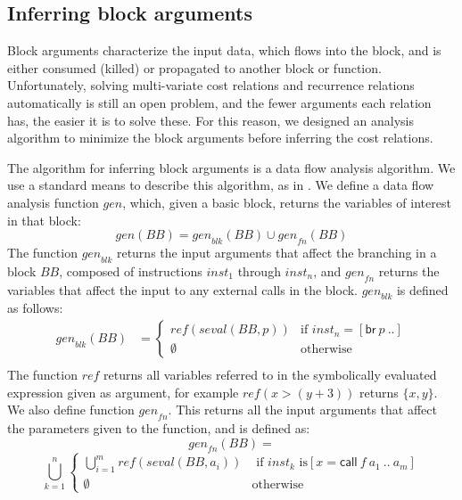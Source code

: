 \documentclass[9pt,preprint]{sigplanconf}
\newcommand{\mathspace}[1]{\ensuremath{#1}\xspace}
\newcommand{\instit}[1]{\mathspace{\mathsf{#1}}}
\newcommand{\aBlock}{\mathspace{\mathit{BB}}}
\newcommand{\Gen}{\mathspace{\mathit{gen}}}
\newcommand{\inst}{\mathspace{\mathit{inst}}}
\newcommand{\seval}{\mathspace{\mathit{seval}}}
\newcommand{\Ref}{\mathspace{\mathit{ref}}}
\newcommand{\call}{\instit{call}}
\newcommand{\br}{\instit{br}}
\begin{document}
\subsection{Inferring block arguments}
Block arguments characterize the input data, which flows into the block, and is
either consumed (killed) or propagated to another block or function. Unfortunately, solving multi-variate cost relations
and recurrence relations automatically is still an open problem, and the fewer
arguments each relation has, the easier it is to solve these. For this reason,
we designed an analysis algorithm to minimize the block arguments before
inferring the cost relations.

The algorithm for inferring block arguments is a data flow analysis
algorithm. We use a standard means to describe this algorithm, as in
\cite{Nielson99}.
We define a data flow analysis function \Gen,
which, given a basic block, returns the variables of interest in that block:
\begin{equation*}
\Gen(\aBlock)=\Gen_{blk}(\aBlock)\cup \Gen_{fn}(\aBlock)
\end{equation*}
The function $\Gen_{blk}$ returns the input arguments that affect the branching in a block
\aBlock, composed of instructions $\inst_1$
through $\inst_n$, and $\Gen_{fn}$ returns the variables that affect the input to any
external calls in the block. $\Gen_{blk}$ is defined as follows:
\begin{align*}
\Gen_{blk}(\aBlock)&=
\begin{cases}
 \Ref(\seval(\aBlock,p)) &\text{if }\inst_n=[\br~p~..]\\
 \emptyset & \text{otherwise}
\end{cases}\\
\end{align*}
The function \Ref returns all variables referred to in the symbolically
evaluated expression given as argument, for example $\Ref(x>(y+3))$ returns
$\{x,y\}$. We also define function $\Gen_{fn}$. This returns all the input
arguments that affect the parameters given to the function, and is defined as:
\begin{equation*}
\Gen_{fn}(\aBlock)=
\end{equation*}
\begin{equation*}
\bigcup\limits_{k=1}^{n}
\begin{cases}
\bigcup\limits_{i=1}^{m}\Ref(\seval(\aBlock,a_i))&\text{ if } \inst_k \text{ is
}[x=\call~f~a_1~..~a_m] \\
\emptyset & \text{otherwise}
\end{cases}
\end{equation*}
\end{document}
